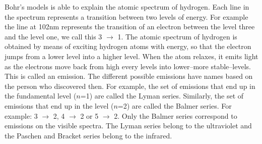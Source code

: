 \documentclass[main.tex]{subfiles}
\newcommand\chapterlabel{electrons}
\begin{document}
\begin{description}
\begin{center}
\end{center}

   
   
   





\item[\docfilehook{Transition energies}{Transition energies}]
Bohr's models is able to explain the atomic spectrum of hydrogen. Each line in the spectrum represents a transition between two levels of energy. For example the line at 102nm represents the transition of an electron between the level three and the level one, we call this 3 $\rightarrow$ 1. The atomic spectrum of hydrogen is obtained by means of exciting hydrogen atoms with energy, so that the electron jumps from a lower level into a higher level. When the atom relaxes, it emits light as the electrons move back from high every levels into lower--more stable--levels. This is called an emission. The different possible emissions have names based on the person who discovered then. For example, the set of emissions that end up in the fundamental level ($n$=1) are called the Lyman series. Similarly, the set of emissions that end up in the level ($n$=2) are called the Balmer series. For example: 3 $\rightarrow$ 2, 4 $\rightarrow$ 2 or 5 $\rightarrow$ 2. Only the Balmer series correspond to emissions on the visible spectra. The Lyman series belong to the ultraviolet and the Paschen and Bracket series belong to the infrared.


\end{description}
\end{document}
